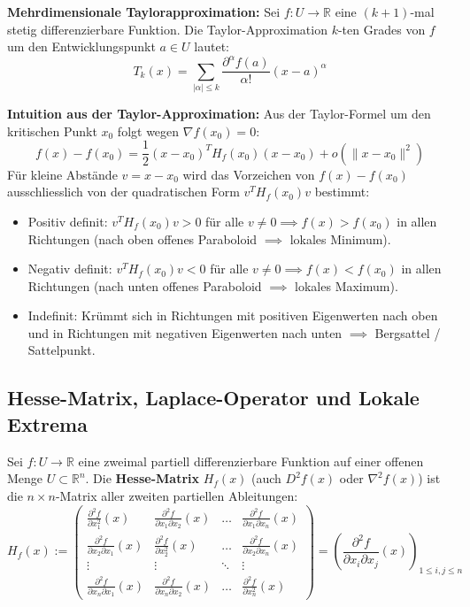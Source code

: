 \begin{definition}
    \textbf{Mehrdimensionale Taylorapproximation:} Sei $f: U \to \mathbb{R}$ eine $(k+1)$-mal stetig differenzierbare Funktion. Die Taylor-Approximation $k$-ten Grades von $f$ um den Entwicklungspunkt $a \in U$ lautet:
    $$ T_k(x) = \sum_{|\alpha| \le k} \frac{\partial^\alpha f(a)}{\alpha!} (x - a)^\alpha $$
\end{definition}

\begin{remark}
    \textbf{Intuition aus der Taylor-Approximation:} Aus der Taylor-Formel um den kritischen Punkt $x_0$ folgt wegen $\nabla f(x_0) = 0$:
    $$ f(x) - f(x_0) = \frac{1}{2} (x - x_0)^T H_f(x_0) (x - x_0) + o(\|x - x_0\|^2) $$
    Für kleine Abstände $v = x - x_0$ wird das Vorzeichen von $f(x) - f(x_0)$ ausschliesslich von der quadratischen Form $v^T H_f(x_0) v$ bestimmt:
    \begin{itemize}
        \item Positiv definit: $v^T H_f(x_0) v > 0$ für alle $v \neq 0 \implies f(x) > f(x_0)$ in allen Richtungen (nach oben offenes Paraboloid $\implies$ lokales Minimum).
        \item Negativ definit: $v^T H_f(x_0) v < 0$ für alle $v \neq 0 \implies f(x) < f(x_0)$ in allen Richtungen (nach unten offenes Paraboloid $\implies$ lokales Maximum).
        \item Indefinit: Krümmt sich in Richtungen mit positiven Eigenwerten nach oben und in Richtungen mit negativen Eigenwerten nach unten $\implies$ Bergsattel / Sattelpunkt.
    \end{itemize}
\end{remark}

\subsection{Hesse-Matrix, Laplace-Operator und Lokale Extrema}

\begin{definition}
    Sei $f: U \to \mathbb{R}$ eine zweimal partiell differenzierbare Funktion auf einer offenen Menge $U \subset \mathbb{R}^n$. Die \textbf{Hesse-Matrix} $H_f(x)$ (auch $D^2 f(x)$ oder $\nabla^2 f(x)$) ist die $n \times n$-Matrix aller zweiten partiellen Ableitungen:
    $$ H_f(x) := \begin{pmatrix} 
    \frac{\partial^2 f}{\partial x_1^2}(x) & \frac{\partial^2 f}{\partial x_1 \partial x_2}(x) & \dots & \frac{\partial^2 f}{\partial x_1 \partial x_n}(x) \\
    \frac{\partial^2 f}{\partial x_2 \partial x_1}(x) & \frac{\partial^2 f}{\partial x_2^2}(x) & \dots & \frac{\partial^2 f}{\partial x_2 \partial x_n}(x) \\
    \vdots & \vdots & \ddots & \vdots \\
    \frac{\partial^2 f}{\partial x_n \partial x_1}(x) & \frac{\partial^2 f}{\partial x_n \partial x_2}(x) & \dots & \frac{\partial^2 f}{\partial x_n^2}(x)
    \end{pmatrix} = \left( \frac{\partial^2 f}{\partial x_i \partial x_j}(x) \right)_{1 \le i, j \le n} $$
\end{definition}

